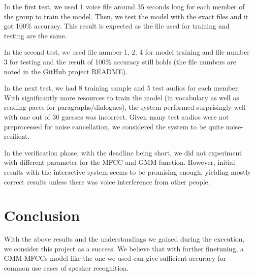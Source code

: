 \documentclass[a4paper,12pt]{article}
\begin{document}
In the first test, we used 1 voice file around 35 seconds long for each member
of the group to train the model.  Then, we test the model with the exact
files and it got 100\% accuracy.  This result is expected as the file used
for training and testing are the same.

In the second test, we used file number 1, 2, 4 for model training and file
number 3 for testing and the result of 100\% accuracy still holds (the file
numbers are noted in the GitHub project README).

In the next test, we had 8 training sample and 5 test audios for each member.
With significantly more resources to train the model (in vocabulary as well as
reading paces for paragraphs/dialogues), the system performed surprisingly well
with one out of 30 guesses was incorrect.  Given many test audios were not
preprocessed for noise cancellation, we considered the system to be quite
noise-resilient.

In the verification phase, with the deadline being short, we did not experiment
with different parameter for the MFCC and GMM function.  However, initial
results with the interactive system seems to be promising enough, yielding
mostly correct results unless there was voice interference from other people.

\newpage
\section{Conclusion}
With the above results and the understandings we gained during the execution,
we consider this project as a success.  We believe that with further finetuning,
a GMM-MFCCs model like the one we used can give sufficient accuracy for common
use cases of speaker recognition.
\end{document}
